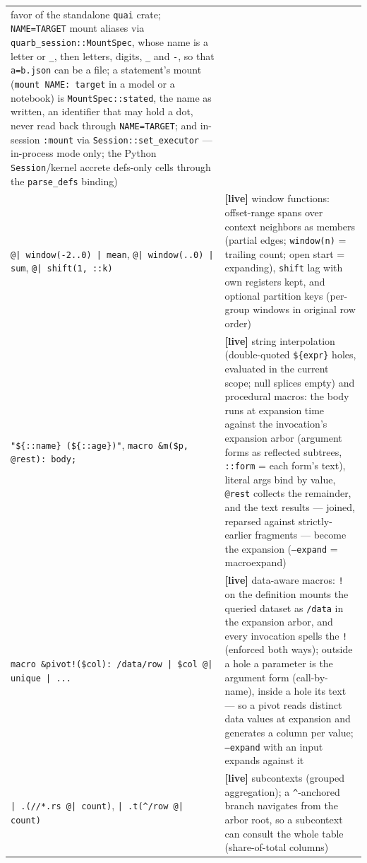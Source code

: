 \documentclass{report}
\newcommand{\live}{\textbf{\textcolor{blue!60!black}{[live]}}\xspace}
\begin{document}
\begin{xltabular}{\textwidth}{>{\raggedright\arraybackslash}p{0.36\textwidth} X}
    favor of the standalone \texttt{quai} crate;
    \texttt{NAME=TARGET} mount aliases via
    \texttt{quarb\_session::MountSpec}, whose name is a letter or
    \texttt{\_}, then letters, digits, \texttt{\_} and \texttt{-},
    so that \texttt{a=b.json} can be a file; a statement's mount
    (\texttt{mount NAME: target} in a model or a notebook) is
    \texttt{MountSpec::stated}, the name as written, an identifier
    that may hold a dot, never read back through
    \texttt{NAME=TARGET}; and in-session
    \texttt{:mount} via \texttt{Session::set\_executor} ---
    in-process mode only; the Python \texttt{Session}/kernel
    accrete defs-only cells through the \texttt{parse\_defs}
    binding) \\
\texttt{@| window(-2..0) | mean}, \texttt{@| window(..0) | sum},
\texttt{@| shift(1, ::k)}
  & \live window functions: offset-range spans over context
    neighbors as members (partial edges; \texttt{window(n)} =
    trailing count; open start = expanding), \texttt{shift} lag
    with own registers kept, and optional partition keys
    (per-group windows in original row order) \\
\texttt{"\$\{::name\} (\$\{::age\})"},
\texttt{macro \&m(\$p, @rest): body;}
  & \live string interpolation (double-quoted \texttt{\$\{expr\}}
    holes, evaluated in the current scope; null splices empty) and
    procedural macros: the body runs at expansion time against the
    invocation's expansion arbor (argument forms as reflected
    subtrees, \texttt{::form} = each form's text), literal args bind
    by value, \texttt{@rest} collects the remainder, and the text
    results — joined, reparsed against strictly-earlier fragments —
    become the expansion (\texttt{--expand} = macroexpand) \\
\texttt{macro \&pivot!(\$col): /data/row | \$col @| unique | ...}
  & \live data-aware macros: \texttt{!} on the definition mounts the
    queried dataset as \texttt{/data} in the expansion arbor, and
    every invocation spells the \texttt{!} (enforced both ways);
    outside a hole a parameter is the argument form (call-by-name),
    inside a hole its text — so a pivot reads distinct data values
    at expansion and generates a column per value;
    \texttt{--expand} with an input expands against it \\
\texttt{| .(//*.rs @| count)}, \texttt{| .t(\^{}/row @| count)}
  & \live subcontexts (grouped aggregation); a \texttt{\^{}}-anchored
    branch navigates from the arbor root, so a subcontext can
    consult the whole table (share-of-total columns) \\

\end{xltabular}
\end{document}
